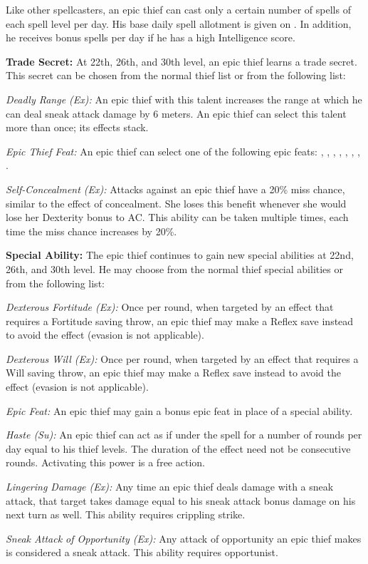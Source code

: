 Like other spellcasters, an epic thief can cast only a certain number of spells of each spell level per day. His base daily spell allotment is given on . In addition, he receives bonus spells per day if he has a high Intelligence score.

\textbf{Trade Secret:} At 22th, 26th, and 30th level, an epic thief learns a trade secret. This secret can be chosen from the normal thief list or from the following list:

\textit{Deadly Range (Ex):} An epic thief with this talent increases the range at which he can deal sneak attack damage by 6 meters. An epic thief can select this talent more than once; its effects stack.

\textit{Epic Thief Feat:} An epic thief can select one of the following epic feats:
,
,
,
,
,
,
,
.

\textit{Self-Concealment (Ex):} Attacks against an epic thief have a 20\% miss chance, similar to the effect of concealment. She loses this benefit whenever she would lose her Dexterity bonus to AC. This ability can be taken multiple times, each time the miss chance increases by 20\%.


\textbf{Special Ability:} The epic thief continues to gain new special abilities at 22nd, 26th, and 30th level. He may choose from the normal thief special abilities or from the following list:

\textit{Dexterous Fortitude (Ex):} Once per round, when targeted by an effect that requires a Fortitude saving throw, an epic thief may make a Reflex save instead to avoid the effect (evasion is not applicable).

\textit{Dexterous Will (Ex):} Once per round, when targeted by an effect that requires a Will saving throw, an epic thief may make a Reflex save instead to avoid the effect (evasion is not applicable).

\textit{Epic Feat:} An epic thief may gain a bonus epic feat in place of a special ability.

\textit{Haste (Su):} An epic thief can act as if under the  spell for a number of rounds per day equal to \onefifth his thief levels. The duration of the effect need not be consecutive rounds. Activating this power is a free action.

\textit{Lingering Damage (Ex):} Any time an epic thief deals damage with a sneak attack, that target takes damage equal to his sneak attack bonus damage on his next turn as well. This ability requires crippling strike.

\textit{Sneak Attack of Opportunity (Ex):} Any attack of opportunity an epic thief makes is considered a sneak attack. This ability requires opportunist.



